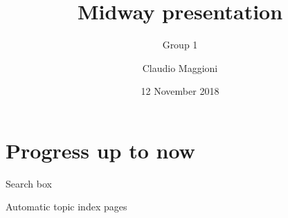 \documentclass[10pt]{beamer}
\title{Midway presentation}
\subtitle{Group 1}
\date{12 November 2018}
\author{Claudio Maggioni}
\begin{document}
\maketitle

\begin{frame}[standout]
\end{frame}

\section{Progress up to now}

\begin{frame}[fragile]{Search box}
\vfill{}\vfill
\end{frame}

\begin{frame}[fragile]{Automatic topic index pages}
\vfill{}\vfill
\end{frame}
\end{document}
